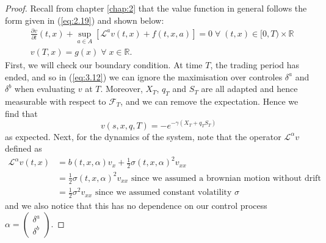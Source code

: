 \begin{proof}
    Recall from chapter \ref{chap:2} that the value function in general follows the 
    form given in (\ref{eq:2.19}) and shown below:
    \begin{equation*}
        \begin{aligned}
            &\frac{\partial v}{\partial t}(t,x)+\sup_{a\in A}\left[\mathcal{L}^av(t,x)+f(t,x,a)\right]=0\;\forall\;(t,x)\in[0,T)\times\mathbb{R}\\
            &v(T,x)=g(x)\;\forall\;x\in\mathbb{R}.
        \end{aligned}
    \end{equation*}
    First, we will check our boundary condition. At time $T$, the trading period 
    has ended, and so in (\ref{eq:3.12}) we can ignore the maximisation over 
    controles $\delta^a$ and $\delta^b$ when evaluating $v$ at $T$. Moreover,
    $X_T$, $q_T$ and $S_T$ are all adapted and hence measurable with respect to 
    $\mathcal{F}_T$, and we can remove the expectation. Hence we find that 
    \begin{equation}
        v(s,x,q,T)=-e^{-\gamma(X_T+q_TS_T)}
    \end{equation}
    as expected. Next, for the dynamics of the system, note that the operator 
    $\mathcal{L}^\alpha v$ defined as 
    \begin{align*}
        \mathcal{L}^\alpha v(t,x)&=b(t,x,\alpha)v_x+\frac{1}{2}\sigma(t,x,\alpha)^2v_{xx}\\
        &=\frac{1}{2}\sigma(t,x,\alpha)^2v_{xx}\textrm{ since we assumed a brownian motion without drift}\\
        &=\frac{1}{2}\sigma^2v_{xx}\textrm{ since we assumed constant volatility $\sigma$}
    \end{align*}
    and we also notice that this has no dependence on our control process 
    $\alpha=\begin{pmatrix}\delta^{a}\\\delta^{b}\end{pmatrix}$.


\end{proof}
